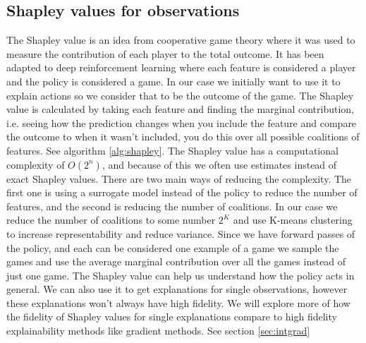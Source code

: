 \documentclass[UKenglish]{uiomasterthesis}
\begin{document}
\subsection{Shapley values for observations}
The Shapley value is an idea from cooperative game theory where it was used to measure the contribution of each player to the total outcome. It has been adapted to deep reinforcement learning where each feature is considered a player and the policy is considered a game. In our case we initially want to use it to explain actions so we consider that to be the outcome of the game. The Shapley value is calculated by taking each feature and finding the marginal contribution, i.e. seeing how the prediction changes when you include the feature and compare the outcome to when it wasn't included, you do this over all possible coalitions of features. See algorithm \ref{alg:shapley}.
The Shapley value has a computational complexity of $O(2^n)$, and because of this we often use estimates instead of exact Shapley values. There are two main ways of reducing the complexity. The first one is using a surrogate model instead of the policy to reduce the number of features, and the second is reducing the number of coalitions. In our case we reduce the number of coalitions to some number $2^K$ and use K-means clustering to increase representability and reduce variance.
Since we have forward passes of the policy, and each can be considered one example of a game we sample the games and use the average marginal contribution over all the games instead of just one game.
The Shapley value can help us understand how the policy acts in general. We can also use it to get explanations for single observations, however these explanations won't always have high fidelity. We will explore more of how the fidelity of Shapley values for single explanations compare to high fidelity explainability methods like gradient methods. See section \ref{sec:intgrad}
\end{document}
